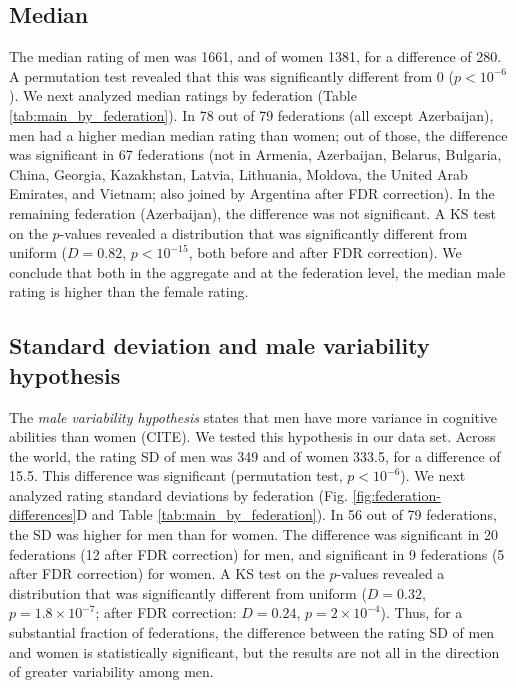 \documentclass[9pt,twocolumn,twoside,lineno]{pnas-new}
\begin{document}
\subsection*{Median} 
The median rating of men was 1661, and of women 1381, for a difference of 280.  A permutation test revealed that this was significantly different from 0 ($p < 10^{-6}$). We next analyzed  median ratings by federation (Table \ref{tab:main_by_federation}).  In 78 out of 79 federations (all except Azerbaijan), men had a higher median median rating than women; out of those, the difference was significant in 67 federations (not in Armenia, Azerbaijan, Belarus, Bulgaria, China, Georgia, Kazakhstan, Latvia, Lithuania, Moldova, the United Arab Emirates, and Vietnam; also joined by Argentina after FDR correction). In the remaining federation (Azerbaijan), the difference was not significant. A KS test on the $p$-values revealed a distribution that was significantly different from uniform ($D=0.82$, $p < 10^{-15}$, both before and after FDR correction). We conclude that both in the aggregate and at the federation level, the median male rating is higher than the female rating.


\subsection*{Standard deviation and male variability hypothesis}
The {\it male variability hypothesis} states that men have more variance in cognitive abilities than women (CITE). We tested this hypothesis in our data set. Across the world, the rating SD of men was 349 and of women 333.5, for a difference of 15.5. This difference was significant (permutation test, $p < 10^{-6}$). We next analyzed rating standard deviations by federation (Fig. \ref{fig:federation-differences}D and Table \ref{tab:main_by_federation}). In 56 out of 79 federations, the SD was higher for men than for women. The difference was significant in 20 federations (12 after FDR correction) for men, and significant in 9 federations (5 after FDR correction) for women. A KS test on the $p$-values revealed a distribution that was significantly different from uniform ($D = 0.32$, $p = 1.8\times 10^{-7}$; after FDR correction: $D= 0.24$, $p=2\times 10^{-4}$). Thus, for a substantial fraction of federations, the difference between the rating SD of men and women is statistically significant, but the results are not all in the direction of greater variability among men.
\end{document}
